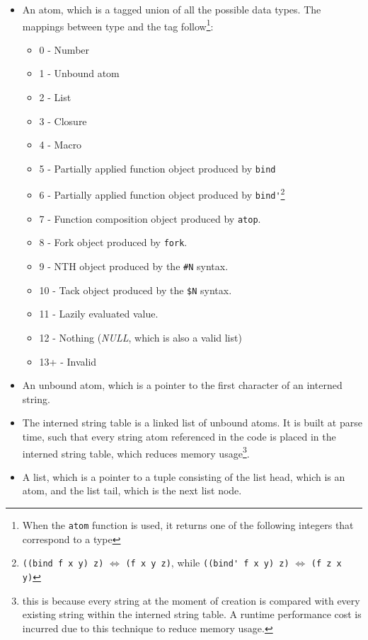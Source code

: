 \begin{itemize}
    \item An atom, which is a tagged union of all the possible data types. The mappings between type and the tag follow\footnote{When the \verb|atom| function is used, it returns one of the following integers that correspond to a type}:
    \begin{itemize}
        \item 0 - Number
        \item 1 - Unbound atom
        \item 2 - List
        \item 3 - Closure
        \item 4 - Macro
        \item 5 - Partially applied function object produced by \verb|bind|
        \item 6 - Partially applied function object produced by \verb|bind'|\footnote{\verb|((bind f x y) z)| $\Leftrightarrow$ \verb|(f x y z)|, while \verb|((bind' f x y) z)| $\Leftrightarrow$ \verb|(f z x y)|}
        \item 7 - Function composition object produced by \verb|atop|.
        \item 8 - Fork object produced by \verb|fork|.
        \item 9 - NTH object produced by the \verb|#N| syntax.
        \item 10 - Tack object produced by the \verb|$N| syntax.
        \item 11 - Lazily evaluated value.
        \item 12 - Nothing (\textit{NULL}, which is also a valid list)
        \item 13+ - Invalid
    \end{itemize}
    \item An unbound atom, which is a pointer to the first character of an interned string.
    \item The interned string table is a linked list of unbound atoms. It is built at parse time, such that every string atom referenced in the code is placed in the interned string table, which reduces memory usage\footnote{this is because every string at the moment of creation is compared with every existing string within the interned string table. A runtime performance cost is incurred due to this technique to reduce memory usage.}.
    \item A list, which is a pointer to a tuple consisting of the list head, which is an atom, and the list tail, which is the next list node.

\end{itemize}
